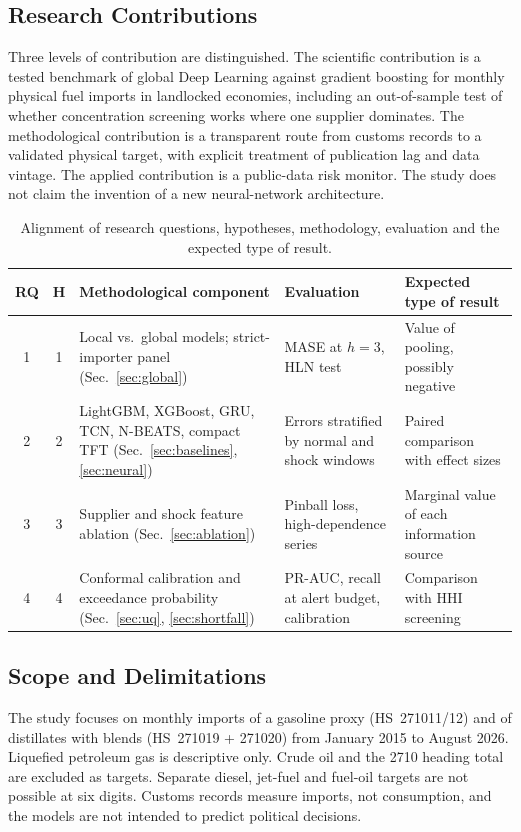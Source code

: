 \documentclass[conference]{IEEEtran}
\begin{document}
\subsection{Research Contributions}
Three levels of contribution are distinguished. The scientific contribution is a tested benchmark of global Deep Learning against gradient boosting for monthly physical fuel imports in landlocked economies, including an out-of-sample test of whether concentration screening works where one supplier dominates. The methodological contribution is a transparent route from customs records to a validated physical target, with explicit treatment of publication lag and data vintage. The applied contribution is a public-data risk monitor. The study does not claim the invention of a new neural-network architecture.

\begin{table}[t]
\centering
\caption{Alignment of research questions, hypotheses, methodology, evaluation and the expected type of result.}
\label{tab:alignment}
\small
\begin{tabularx}{\textwidth}{@{}c c >{\hsize=1.05\hsize}X >{\hsize=0.95\hsize}X X@{}}
\toprule
RQ & H & Methodological component & Evaluation & Expected type of result\\
\midrule
1 & 1 & Local vs.\ global models; strict-importer panel (Sec.~\ref{sec:global}) & MASE at $h=3$, HLN test & Value of pooling, possibly negative\\
2 & 2 & LightGBM, XGBoost, GRU, TCN, N-BEATS, compact TFT (Sec.~\ref{sec:baselines}, \ref{sec:neural}) & Errors stratified by normal and shock windows & Paired comparison with effect sizes\\
3 & 3 & Supplier and shock feature ablation (Sec.~\ref{sec:ablation}) & Pinball loss, high-dependence series & Marginal value of each information source\\
4 & 4 & Conformal calibration and exceedance probability (Sec.~\ref{sec:uq}, \ref{sec:shortfall}) & PR-AUC, recall at alert budget, calibration & Comparison with HHI screening\\
\bottomrule
\end{tabularx}
\end{table}

\subsection{Scope and Delimitations}
The study focuses on monthly imports of a gasoline proxy (HS~271011/12) and of distillates with blends (HS~271019 + 271020) from January 2015 to August 2026. Liquefied petroleum gas is descriptive only. Crude oil and the 2710 heading total are excluded as targets. Separate diesel, jet-fuel and fuel-oil targets are not possible at six digits. Customs records measure imports, not consumption, and the models are not intended to predict political decisions.
\end{document}
